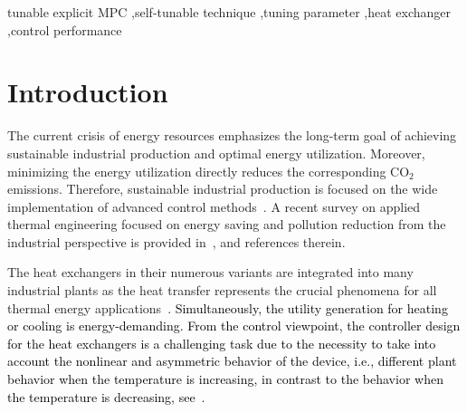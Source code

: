 \documentclass[preprint,12pt]{elsarticle}
\newcommand{\change}[1]{\textcolor{black}{#1}}
\begin{document}
\begin{frontmatter}
		\begin{keyword}
			tunable explicit MPC \sep self-tunable technique \sep tuning parameter \sep heat exchanger \sep control performance
			
			\end{keyword}
		
		\end{frontmatter}
	
	
	\section{Introduction}
	\label{sec:introduction}
	

	The current crisis of energy resources emphasizes the long-term goal of achieving sustainable industrial production and optimal energy utilization. Moreover, minimizing the energy utilization directly reduces the corresponding CO$_{2}$ emissions. Therefore, sustainable industrial production is focused on the wide implementation of advanced control methods~\cite{MN20}. A recent survey on applied thermal engineering focused on energy saving and pollution reduction from the industrial perspective is provided in~\cite{YV16}, and references therein.
	
	The heat exchangers in their numerous variants are integrated into many industrial plants as the heat transfer represents the crucial phenomena for all thermal energy applications~\cite{KV18}. \change{Simultaneously, the utility generation for heating or cooling is energy-demanding. From the control viewpoint, the controller design for the heat exchangers is a challenging task due to the necessity to take into account the nonlinear and asymmetric behavior of the device, i.e., different plant behavior when the temperature is increasing, in contrast to the behavior when the temperature is decreasing, see~\cite{RL20}.} 
	
	
\end{document}
